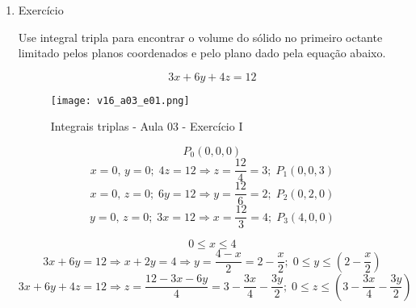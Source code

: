 \begin{enumerate}
	\item Exercício
	
	Use integral tripla para encontrar o volume do sólido no primeiro octante limitado pelos planos coordenados e pelo plano dado pela equação abaixo.
	
	\begin{equation*}
		3x + 6y + 4z = 12
	\end{equation*}
	
	\begin{figure}[htb]
		\caption{Integrais triplas - Aula 03 - Exercício I}
		\label{v16_a03_e01}
		\centering
		\texttt{[image: v16\_a03\_e01.png]}		
	\end{figure}
	
	\begin{equation*}
		P_0(0,0,0) 
	\end{equation*}
	\begin{equation*}
		x = 0,\, y = 0;\; 4z = 12 \Rightarrow z = \dfrac{12}{4}	= 3;\; P_1(0,0,3)
	\end{equation*}
	\begin{equation*}
		x = 0,\, z = 0;\; 6y = 12 \Rightarrow y = \dfrac{12}{6} = 2;\; P_2(0,2,0)
	\end{equation*}
	\begin{equation*}
		y = 0,\, z = 0;\; 3x = 12 \Rightarrow x = \dfrac{12}{3} = 4;\; P_3(4,0,0)
	\end{equation*}	
	
	\begin{equation*}
		0 \leq x \leq 4
	\end{equation*}
	\begin{equation*}
		3x + 6y = 12 \Rightarrow x + 2y = 4 \Rightarrow y = \dfrac{4 - x}{2} = 2 - \dfrac{x}{2};\; 0 \leq y \leq \left(2 - \dfrac{x}{2}\right)
	\end{equation*}
	\begin{equation*}
		3x + 6y + 4z = 12 \Rightarrow z = \dfrac{12 - 3x - 6y}{4} = 3 - \dfrac{3x}{4} - \dfrac{3y}{2} ;\; 0 \leq z \leq \left(3 - \dfrac{3x}{4} - \dfrac{3y}{2}\right)
	\end{equation*}
			

\end{enumerate}
